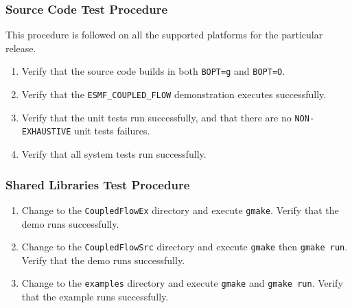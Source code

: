 \subsubsection{Source Code Test Procedure}

This procedure is followed on all the supported platforms for the particular release.

\begin{enumerate}
\item Verify that the source code builds in both {\tt BOPT=g} and {\tt BOPT=O}.
\item Verify that  the {\tt ESMF\_COUPLED\_FLOW} demonstration executes successfully.
\item Verify that the unit tests run successfully, and that there are no {\tt NON-EXHAUSTIVE} unit tests  failures.
\item Verify that all system tests run successfully. 
\end{enumerate}


\subsubsection{Shared Libraries Test Procedure}

\begin{enumerate}
\item Change to the {\tt CoupledFlowEx} directory and execute {\tt gmake}. Verify that the demo runs successfully.
\item Change to the {\tt CoupledFlowSrc} directory and execute {\tt gmake} then {\tt gmake run}. Verify that the demo runs successfully.
\item Change to the {\tt examples} directory and execute {\tt gmake} and {\tt gmake run}. Verify that the example runs successfully.
\end{enumerate}














